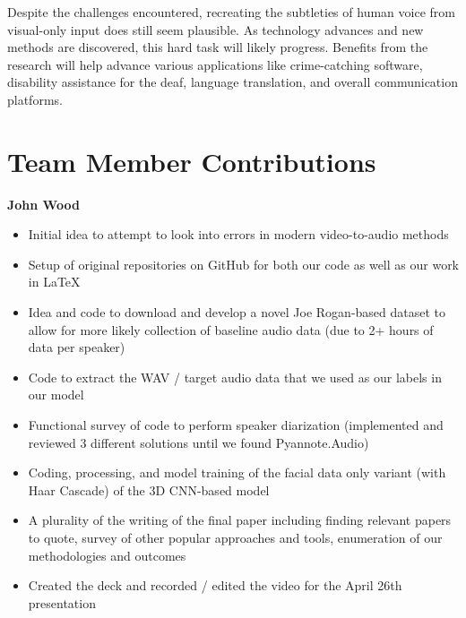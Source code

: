 \documentclass[10pt,twocolumn,letterpaper]{article}
\begin{document}
Despite the challenges encountered, recreating the subtleties of human voice from visual-only input does still seem plausible. As technology advances and new methods are discovered, this hard task will likely progress. Benefits from the research will help advance various applications like crime-catching software, disability assistance for the deaf, language translation, and overall communication platforms. 



\section{Team Member Contributions}
\label{sec:conclusion}
\textbf{{John Wood}}
\begin{itemize}
    \item Initial idea to attempt to look into errors in modern video-to-audio methods
    \item Setup of original repositories on GitHub for both our code as well as our work in \LaTeX 
    \item Idea and code to download and develop a novel Joe Rogan-based dataset to allow for more likely collection of baseline audio data (due to 2+ hours of data per speaker)
    \item Code to extract the WAV / target audio data that we used as our labels in our model
    \item Functional survey of code to perform speaker diarization (implemented and reviewed 3 different solutions until we found Pyannote.Audio)
    \item Coding, processing, and model training of the facial data only variant (with Haar Cascade) of the 3D CNN-based model 
    \item A plurality of the writing of the final paper including finding relevant papers to quote,  survey of other popular approaches and tools, enumeration of our methodologies and outcomes
    \item Created the deck and recorded / edited the video for the April 26th presentation
\end{itemize}
\end{document}
